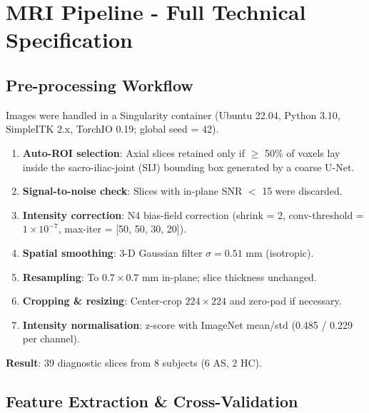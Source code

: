 \documentclass[12pt, a4paper]{article}
\begin{document}
\section{MRI Pipeline - Full Technical Specification}

\subsection{Pre-processing Workflow}
Images were handled in a Singularity container (Ubuntu 22.04, Python 3.10, SimpleITK 2.x, TorchIO 0.19; global seed = 42).

\begin{enumerate}
    \item \textbf{Auto-ROI selection}: Axial slices retained only if $\ge$ 50\% of voxels lay inside the sacro-iliac-joint (SIJ) bounding box generated by a coarse U-Net.
    \item \textbf{Signal-to-noise check}: Slices with in-plane SNR $<$ 15 were discarded.
    \item \textbf{Intensity correction}: N4 bias-field correction (shrink = 2, conv-threshold = \( 1 \times 10^{-7} \), max-iter = [50, 50, 30, 20]).
    \item \textbf{Spatial smoothing}: 3-D Gaussian filter \( \sigma = 0.51 \) mm (isotropic).
    \item \textbf{Resampling}: To \( 0.7 \times 0.7 \) mm in-plane; slice thickness unchanged.
    \item \textbf{Cropping \& resizing}: Center-crop \( 224 \times 224 \) and zero-pad if necessary.
    \item \textbf{Intensity normalisation}: z-score with ImageNet mean/std (0.485 / 0.229 per channel).
\end{enumerate}

\textbf{Result}: 39 diagnostic slices from 8 subjects (6 AS, 2 HC).

\subsection{Feature Extraction \& Cross-Validation}
\end{document}
